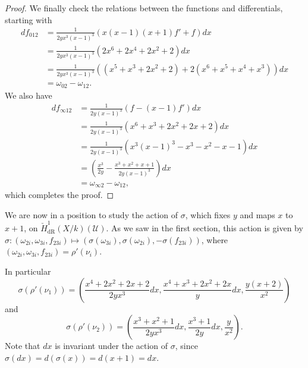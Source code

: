 \documentclass[draft, 11pt]{article} %
\theoremstyle{plain}
\theoremstyle{remark}
\newcommand{\cU}{{\mathcal U}}
\newcommand{\cechderhamhone}{\check{H}_{\text {dR}}^1(X/k)}
\begin{document}
\begin{proof}
We finally check the relations between the functions and differentials, starting with
\begin{align*}
df_{0 1 2} & = \frac{1}{2yx^3(x-1)^3} (x(x-1)(x+1)f' + f)dx \\
& = \frac{1}{2yx^3(x-1)^3}(2x^6 + 2x^4 + 2x^2 + 2)dx \\
& = \frac{1}{2yx^3(x-1)^3}((x^5 + x^3 + 2x^2 + 2) + 2(x^6 + x^5 + x^4 + x^3))dx \\
& = \omega_{02} - \omega_{12}.
\end{align*}
We also have
\begin{align*}
df_{\infty 1 2} & = \frac{1}{2y(x-1)^3}(f-(x-1)f')dx \\
& = \frac{1}{2y(x-1)^3}(x^6 + x^3 + 2x^2 + 2x+ 2)dx \\
& = \frac{1}{2y(x-1)^3}(x^3(x-1)^3 - x^3 - x^2 - x - 1) dx \\
& = \left(\frac{x^3}{2y} - \frac{x^3 + x^2 + x+1}{2y(x-1)^3}\right) dx \\
& = \omega_{\infty 2} - \omega_{12},
\end{align*}
which completes the proof.

\end{proof}

We are now in a position to study the action of $\sigma$, which fixes $y$ and maps $x$ to $x+1$, on $\cechderhamhone(\cU)$.
As we saw in the first section, this action is given by $\sigma\colon (\omega_{2i}, \omega_{3i}, f_{23i}) \mapsto (\sigma(\omega_{3i}), \sigma(\omega_{2i}), -\sigma(f_{23i}))$, where $(\omega_{2i}, \omega_{3i}, f_{23i}) = \rho'(\nu_i)$.

In particular
\begin{equation*}\label{sigmanu1}
\sigma(\rho'(\nu_1)) = \left( \frac{x^4+2x^2+2x+2}{2yx^3}dx, \frac{x^4+x^3+2x^2+2x}{y}dx, \frac{y(x+2)}{x^2} \right)
\end{equation*}
and
\begin{equation*}\label{sigmanu2}
\sigma(\rho'(\nu_2)) = \left( \frac{x^3+x^2+1}{2yx^3}dx, \frac{x^3+1}{2y}dx, \frac{y}{x^2} \right).
\end{equation*}
Note that $dx$ is invariant under the action of $\sigma$, since $\sigma(dx) = d (\sigma (x)) = d(x+1) = dx$.
\end{document}
